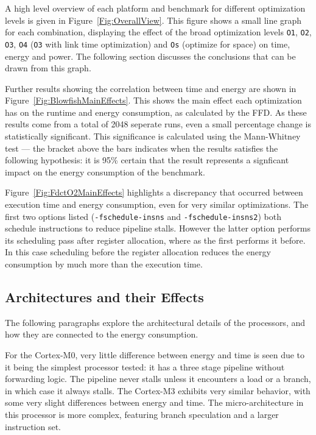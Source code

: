\documentclass[twocolumn]{article}
\begin{document}
A high level overview of each platform and benchmark for different optimization levels is given in Figure~\ref{Fig:OverallView}. This figure shows a small line graph for each combination, displaying the effect of the broad optimization levels \texttt{O1}, \texttt{O2}, \texttt{O3}, \texttt{O4} (\texttt{O3} with link time optimization) and \texttt{Os} (optimize for space) on time, energy and power. The following section discusses the conclusions that can be drawn from this graph.

Further results showing the correlation between time and energy are shown in Figure~\ref{Fig:BlowfishMainEffects}. This shows the main effect each optimization has on the runtime and energy consumption, as calculated by the FFD. As these results come from a total of 2048 seperate runs, even a small percentage change is statistically significant. This significance is calculated using the Mann-Whitney test --- the bracket above the bars indicates when the results satisfies the following hypothesis: it is 95\% certain that the result represents a signficant impact on the energy consumption of the benchmark.

Figure~\ref{Fig:FdctO2MainEffects} highlights a discrepancy that occurred between execution time and energy consumption, even for very similar optimizations. The first two options listed (\texttt{-fschedule-insns} and \texttt{-fschedule-insns2}) both schedule instructions to reduce pipeline stalls. However the latter option performs its scheduling pass after register allocation, where as the first performs it before. In this case scheduling before the register allocation reduces the energy consumption by much more than the execution time.

\subsection{Architectures and their Effects}

The following paragraphs explore the architectural details of the processors, and how they are connected to the energy consumption.

For the Cortex-M0, very little difference between energy and time is seen due to it being the simplest processor tested: it has a three stage pipeline without forwarding logic. The pipeline never stalls unless it encounters a load or a branch, in which case it always stalls. The Cortex-M3 exhibits very similar behavior, with some very slight differences between energy and time. The micro-architecture in this processor is more complex, featuring branch speculation and a larger instruction set\cite{Yiu2010}.
\end{document}
